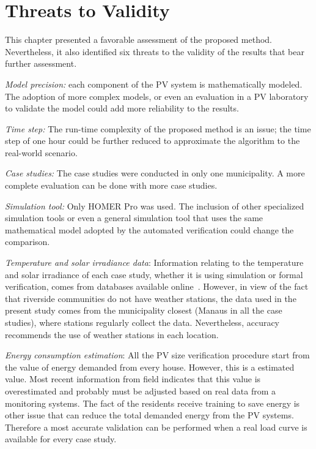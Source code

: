 \section{Threats to Validity}

This chapter presented a favorable assessment of the proposed method. %
Nevertheless, it also identified six threats to the validity of the results that bear further assessment.

\textit{Model precision:} each component of the PV system is mathematically modeled. %
The adoption of more complex models, or even an evaluation in a PV laboratory to validate the model could add more reliability to the results.

\textit{Time step:} The run-time complexity of the proposed method is an issue; the time step of one hour could be further reduced to approximate the algorithm to the real-world scenario.

\textit{Case studies:} The case studies were conducted in only one municipality. A more complete evaluation can be done with more case studies.

\textit{Simulation tool:} Only HOMER Pro was used. The inclusion of other specialized simulation tools or even a general simulation tool that uses the same mathematical model adopted by the automated verification could change the comparison.

\textit{Temperature and solar irradiance data}: Information relating to the temperature and solar irradiance of each case study, whether it is using simulation or formal verification, comes from databases available online~\cite{Temperature, Irradiance}. However, in view of the fact that riverside communities do not have weather stations, the data used in the present study comes from the municipality closest (Manaus in all the case studies), where stations regularly collect the data. Nevertheless, accuracy recommends the use of weather stations in each location.

\textit{Energy consumption estimation}: All the PV size verification procedure start from the value of energy demanded from every house. However, this is a estimated value. Most recent information from field indicates that this value is overestimated and probably must be adjusted based on real data from a monitoring systems. The fact of the residents receive training to save energy is other issue that can reduce the total demanded energy from the PV systems. Therefore a most accurate validation can be performed when a real load curve is available for every case study.

